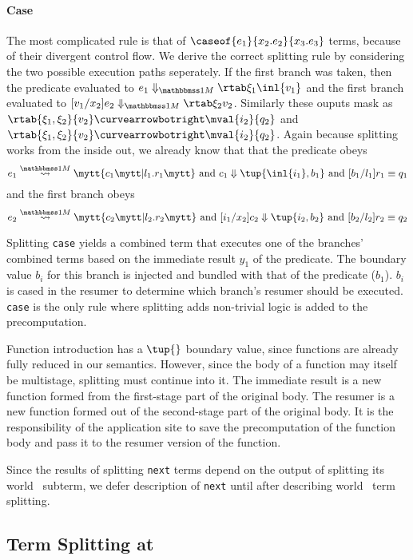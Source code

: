 \begin{abstrsyn}
\paragraph {Case}
The most complicated rule is that of $\caseof {e_1} {x_2.e_2} {x_3.e_3}$ terms, because of their divergent control flow.
We derive the correct splitting rule by considering the two possible execution paths seperately.
If the first branch was taken, then the predicate evaluated to $\diaone {e_1} {\xi_1} {\inl {v_1}}$ 
and the first branch evaluated to $\diaone {[v_1/x_2]e_2} {\xi_2} {v_2}$.
Similarly these ouputs mask as $\rtab {\xi_1,\xi _2} {v_2} \vsplito \mval {i_2} {q_2}$ and $\rtab {\xi_1,\xi _2} {v_2} \vsplito \mval {i_2} {q_2}$.
Again because splitting works from the inside out, we already know that that the predicate obeys
\[
	\splitone {e_1} A {c_1} {l_1.r_1} \text{ and } \reduce {c_1} {\tup{\inl {i_1},b_1}} \text{ and } [b_1/l_1]r_1 \equiv q_1
\]
and the first branch obeys
\[
	\splitone {e_2} A {c_2} {l_2.r_2} \text{ and } \reduce {[i_1/x_2]c_2} {\tup{i_2,b_2}} \text{ and } [b_2/l_2]r_2 \equiv q_2
\]

Splitting {\tt case} yields a combined term that executes one of the branches' combined terms based on the immediate result $y_1$ of the predicate.
The boundary value $b_i$ for this branch is injected and bundled with that of the predicate ($b_1$). 
$b_i$ is cased in the resumer to determine which branch's resumer should be executed.
{\tt case} is the only rule where splitting adds non-trivial logic is added to the precomputation.

Function introduction has a $\tup{}$ boundary value,
since functions are already fully reduced in our semantics.
However, since the body of a function may itself be multistage, splitting must continue into it.
The immediate result is a new function formed from the first-stage part of the original body.
The resumer is a new function formed out of the second-stage part of the original body.
It is the responsibility of the application site to save the precomputation of the function body
and pass it to the resumer version of the function.

Since the results of splitting \texttt{next} terms depend on the output of
splitting its world \bbtwo\ subterm,
we defer description of \texttt{next} until after describing world \bbtwo\ term splitting.

\subsection{Term Splitting at \bbtwo}


\end{abstrsyn}
